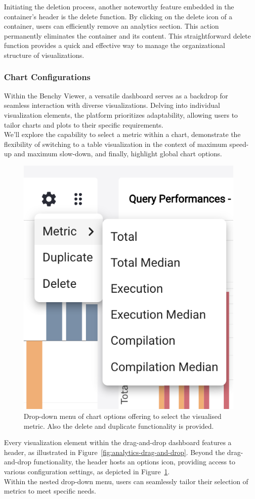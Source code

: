 Initiating the deletion process, another noteworthy feature embedded in the container's header is the delete function. By clicking on the delete icon of a container, users can efficiently remove an analytics section. This action permanently eliminates the container and its content. This straightforward delete function provides a quick and effective way to manage the organizational structure of visualizations.


\subsubsection{Chart Configurations}\label{sec:chart-configuration}

Within the Benchy Viewer, a versatile dashboard serves as a backdrop for seamless interaction with diverse visualizations. Delving into individual visualization elements, the platform prioritizes adaptability, allowing users to tailor charts and plots to their specific requirements.\\
We'll explore the capability to select a metric within a chart, demonstrate the flexibility of switching to a table visualization in the context of maximum speed-up and maximum slow-down, and finally, highlight global chart options.

\begin{figure}[h]
  \centering
  \includegraphics[width=0.35\linewidth]{figures/chart-configuration.png}
  \caption{Drop-down menu of chart options offering to select the visualised metric. Also the delete and duplicate functionality is provided.}
  \label{fig:chart-configuration}
\end{figure}

Every visualization element within the drag-and-drop dashboard features a header, as illustrated in Figure~\ref{fig:analytics-drag-and-drop}. Beyond the drag-and-drop functionality, the header hosts an options icon, providing access to various configuration settings, as depicted in Figure~\ref{fig:chart-configuration}.\\
Within the nested drop-down menu, users can seamlessly tailor their selection of metrics to meet specific needs.

